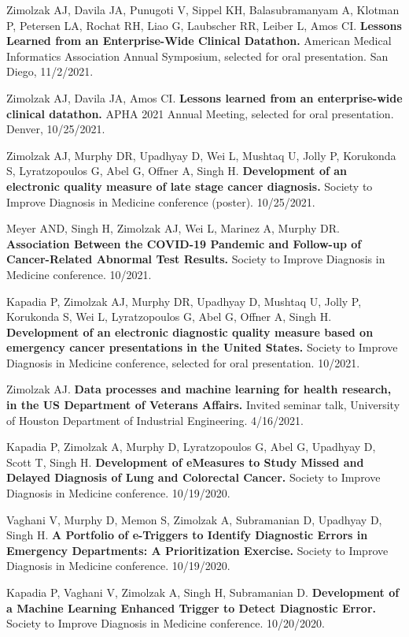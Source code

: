 \documentclass[10pt]{article}
\begin{document}
Zimolzak AJ, Davila JA, Punugoti V, Sippel KH, Balasubramanyam A,
Klotman P, Petersen LA, Rochat RH, Liao G, Laubscher RR, Leiber L,
Amos CI. \textbf{Lessons Learned from an Enterprise-Wide Clinical
  Datathon.} American Medical Informatics Association Annual
Symposium, selected for oral presentation. San Diego, 11/2/2021.

Zimolzak AJ, Davila JA, Amos CI. \textbf{Lessons learned from an
  enterprise-wide clinical datathon.} APHA 2021 Annual Meeting,
selected for oral presentation. Denver, 10/25/2021.


Zimolzak AJ, Murphy DR, Upadhyay D, Wei L, Mushtaq U, Jolly P,
Korukonda S, Lyratzopoulos G, Abel G, Offner A, Singh H.
\textbf{Development of an electronic quality measure of late stage
  cancer diagnosis.} Society to Improve Diagnosis in Medicine
conference (poster). 10/25/2021.

Meyer AND, Singh H, Zimolzak AJ, Wei L, Marinez A, Murphy DR.
\textbf{Association Between the COVID-19 Pandemic and Follow-up of
  Cancer-Related Abnormal Test Results.} Society to Improve Diagnosis
in Medicine conference. 10/2021.

Kapadia P, Zimolzak AJ, Murphy DR, Upadhyay D, Mushtaq U, Jolly P,
Korukonda S, Wei L, Lyratzopoulos G, Abel G, Offner A, Singh H.
\textbf{Development of an electronic diagnostic quality measure based
  on emergency cancer presentations in the United States.} Society to
Improve Diagnosis in Medicine conference, selected for oral
presentation. 10/2021.

Zimolzak AJ. \textbf{Data processes and machine learning for health
  research, in the US Department of Veterans Affairs.} Invited seminar
talk, University of Houston Department of Industrial Engineering.
4/16/2021.


Kapadia P, Zimolzak A, Murphy D, Lyratzopoulos G, Abel G, Upadhyay D,
Scott T, Singh H. \textbf{Development of eMeasures to Study Missed and
  Delayed Diagnosis of Lung and Colorectal Cancer.} Society to Improve
Diagnosis in Medicine conference. 10/19/2020.

Vaghani V, Murphy D, Memon S, Zimolzak A, Subramanian D, Upadhyay D,
Singh H. \textbf{A Portfolio of e-Triggers to Identify Diagnostic
  Errors in Emergency Departments: A Prioritization Exercise.} Society
to Improve Diagnosis in Medicine conference. 10/19/2020.

Kapadia P, Vaghani V, Zimolzak A, Singh H, Subramanian D.
\textbf{Development of a Machine Learning Enhanced Trigger to Detect
  Diagnostic Error.} Society to Improve Diagnosis in Medicine
conference. 10/20/2020.
\end{document}
